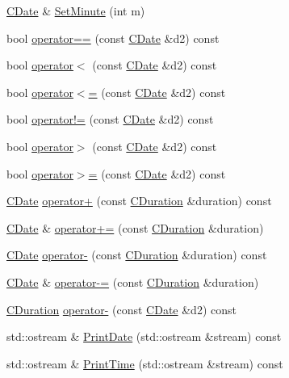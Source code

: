 \begin{DoxyCompactItemize}
\item 
\mbox{\hyperlink{class_c_date}{C\+Date}} \& \mbox{\hyperlink{class_c_date_a1d0fd38b1c94ea47359c325c4422dc31}{Set\+Minute}} (int m)
\item 
bool \mbox{\hyperlink{class_c_date_a28a838b34e2d39ce0eb4491c2361baf2}{operator==}} (const \mbox{\hyperlink{class_c_date}{C\+Date}} \&d2) const
\item 
bool \mbox{\hyperlink{class_c_date_a8a2db90f7b10e1bfc6a9075303721b00}{operator$<$}} (const \mbox{\hyperlink{class_c_date}{C\+Date}} \&d2) const
\item 
bool \mbox{\hyperlink{class_c_date_a4ef63cc76ace80f69dc86b2e9f64e4b8}{operator$<$=}} (const \mbox{\hyperlink{class_c_date}{C\+Date}} \&d2) const
\item 
bool \mbox{\hyperlink{class_c_date_a6f4dd69ce64b0fa9e654e55d54ead67d}{operator!=}} (const \mbox{\hyperlink{class_c_date}{C\+Date}} \&d2) const
\item 
bool \mbox{\hyperlink{class_c_date_aa85c9b1e8406ba15a19fb2e176392771}{operator$>$}} (const \mbox{\hyperlink{class_c_date}{C\+Date}} \&d2) const
\item 
bool \mbox{\hyperlink{class_c_date_a6737cc09a6d10d7d18f32759b8579ae2}{operator$>$=}} (const \mbox{\hyperlink{class_c_date}{C\+Date}} \&d2) const
\item 
\mbox{\hyperlink{class_c_date}{C\+Date}} \mbox{\hyperlink{class_c_date_ac45abf8f357a31af297a2602aecac529}{operator+}} (const \mbox{\hyperlink{class_c_duration}{C\+Duration}} \&duration) const
\item 
\mbox{\hyperlink{class_c_date}{C\+Date}} \& \mbox{\hyperlink{class_c_date_ac56d08174348a544b5c56add4e2634d4}{operator+=}} (const \mbox{\hyperlink{class_c_duration}{C\+Duration}} \&duration)
\item 
\mbox{\hyperlink{class_c_date}{C\+Date}} \mbox{\hyperlink{class_c_date_a7736d3c8fc1c10545ee0f0ce3397f260}{operator-\/}} (const \mbox{\hyperlink{class_c_duration}{C\+Duration}} \&duration) const
\item 
\mbox{\hyperlink{class_c_date}{C\+Date}} \& \mbox{\hyperlink{class_c_date_a42abd6ced54a740fa4f4d90c81845e0c}{operator-\/=}} (const \mbox{\hyperlink{class_c_duration}{C\+Duration}} \&duration)
\item 
\mbox{\hyperlink{class_c_duration}{C\+Duration}} \mbox{\hyperlink{class_c_date_aed1d924914698a4e64da455deb583656}{operator-\/}} (const \mbox{\hyperlink{class_c_date}{C\+Date}} \&d2) const
\item 
std\+::ostream \& \mbox{\hyperlink{class_c_date_aee82efe856e1ef96400c4d3db2854826}{Print\+Date}} (std\+::ostream \&stream) const
\item 
std\+::ostream \& \mbox{\hyperlink{class_c_date_af1c7cb577d4136975d551323e48f5a26}{Print\+Time}} (std\+::ostream \&stream) const
\end{DoxyCompactItemize}

